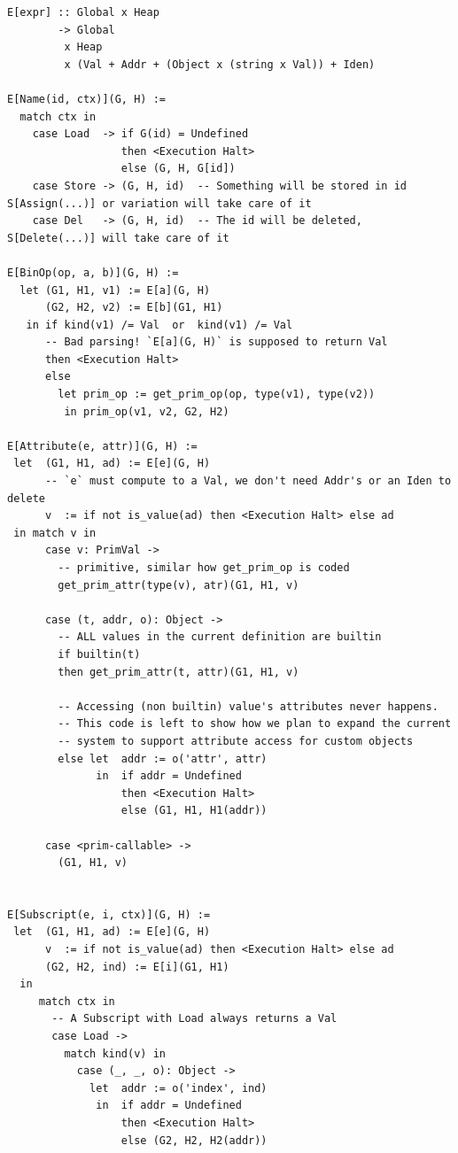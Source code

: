 \documentclass[
11pt, %
english, %
singlespacing, %
headsepline, %
]{MastersDoctoralThesis} %
\begin{document}
\begin{verbatim}
E[expr] :: Global x Heap
        -> Global
         x Heap
         x (Val + Addr + (Object x (string x Val)) + Iden)

E[Name(id, ctx)](G, H) :=
  match ctx in
    case Load  -> if G(id) = Undefined
                  then <Execution Halt>
                  else (G, H, G[id])
    case Store -> (G, H, id)  -- Something will be stored in id S[Assign(...)] or variation will take care of it
    case Del   -> (G, H, id)  -- The id will be deleted, S[Delete(...)] will take care of it

E[BinOp(op, a, b)](G, H) :=
  let (G1, H1, v1) := E[a](G, H)
      (G2, H2, v2) := E[b](G1, H1)
   in if kind(v1) /= Val  or  kind(v1) /= Val
      -- Bad parsing! `E[a](G, H)` is supposed to return Val
      then <Execution Halt>
      else
        let prim_op := get_prim_op(op, type(v1), type(v2))
         in prim_op(v1, v2, G2, H2)

E[Attribute(e, attr)](G, H) :=
 let  (G1, H1, ad) := E[e](G, H)
      -- `e` must compute to a Val, we don't need Addr's or an Iden to delete
      v  := if not is_value(ad) then <Execution Halt> else ad
 in match v in
      case v: PrimVal ->
        -- primitive, similar how get_prim_op is coded
        get_prim_attr(type(v), atr)(G1, H1, v)

      case (t, addr, o): Object ->
        -- ALL values in the current definition are builtin
        if builtin(t)
        then get_prim_attr(t, attr)(G1, H1, v)

        -- Accessing (non builtin) value's attributes never happens.
        -- This code is left to show how we plan to expand the current
        -- system to support attribute access for custom objects
        else let  addr := o('attr', attr)
              in  if addr = Undefined
                  then <Execution Halt>
                  else (G1, H1, H1(addr))

      case <prim-callable> ->
        (G1, H1, v)


E[Subscript(e, i, ctx)](G, H) :=
 let  (G1, H1, ad) := E[e](G, H)
      v  := if not is_value(ad) then <Execution Halt> else ad
      (G2, H2, ind) := E[i](G1, H1)
  in
     match ctx in
       -- A Subscript with Load always returns a Val
       case Load ->
         match kind(v) in
           case (_, _, o): Object ->
             let  addr := o('index', ind)
              in  if addr = Undefined
                  then <Execution Halt>
                  else (G2, H2, H2(addr))


\end{verbatim}
\end{document}
